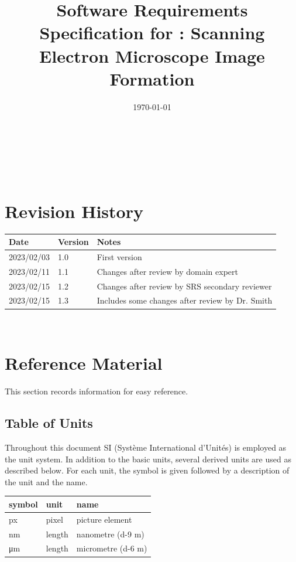 \documentclass[12pt]{article}
\begin{document}

\title{Software Requirements Specification for \progname: Scanning Electron Microscope Image Formation} 
\author{\authname}
\date{\today}
	
\maketitle

~\newpage


\tableofcontents

~\newpage

\section*{Revision History}

\begin{tabularx}{\textwidth}{p{3cm}p{2cm}X}
\toprule {\bf Date} & {\bf Version} & {\bf Notes}\\
\midrule
2023/02/03 & 1.0 & First version\\
2023/02/11 & 1.1 & Changes after review by domain expert\\
2023/02/15 & 1.2 & Changes after review by SRS secondary reviewer\\
2023/02/15 & 1.3 & Includes some changes after review by Dr. Smith\\
\bottomrule
\end{tabularx}

~\newpage

\section{Reference Material}

This section records information for easy reference.

\subsection{Table of Units}

Throughout this document SI (Syst\`{e}me International d'Unit\'{e}s) is employed
as the unit system. In addition to the basic units, several derived units are
used as described below. For each unit, the symbol is given followed by a
description of the unit and the name.
~\newline

  \noindent \begin{tabular}{l l l} 
    \toprule		
    \textbf{symbol} & \textbf{unit} & \textbf{name}\\
    \midrule
    px & pixel & picture element \\
    \si{\nm} & length & nanometre (\num{d-9} m)\\
    \si{\um} & length & micrometre (\num{d-6} m)\\
    \bottomrule
  \end{tabular}
\end{document}
